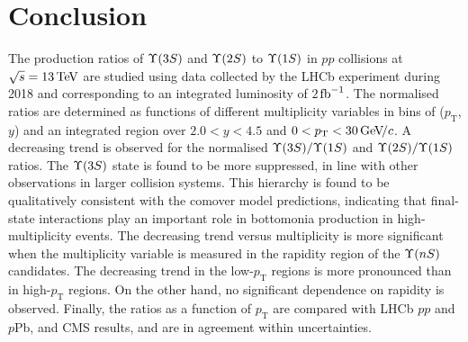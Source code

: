 \documentclass[12pt,a4paper]{article}
\newcommand{\aunit}[1]{\ensuremath{\text{\,#1}}}
\newcommand{\tev}{\aunit{Te\kern -0.1em V}\xspace}
\newcommand{\gevc}{\ensuremath{\aunit{Ge\kern -0.1em V\!/}c}\xspace}
\def\fb   {\ensuremath{\aunit{fb}}\xspace}
\def\invfb   {\ensuremath{\fb^{-1}}\xspace}
\def\pt         {\ensuremath{p_{\mathrm{T}}}\xspace}
\begin{document}
\section{Conclusion}
The production ratios of $\Upsilon{(3S)}$ and $\Upsilon{(2S)}$ to $\Upsilon{(1S)}$ in $pp$ collisions at $\sqrt{s}=13\tev$ are studied using data collected by the LHCb experiment during 2018 and corresponding to an integrated luminosity of $2$\invfb.
 The normalised ratios are determined as functions of different multiplicity variables in bins of (\pt, $y$) and an integrated region over $2.0<y<4.5$ and $0<\pt<30 \gevc$. 
 A decreasing trend is observed for the normalised $\Upsilon{(3S)}/\Upsilon{(1S)}$ and $\Upsilon{(2S)}/\Upsilon{(1S)}$ ratios. 
 The $\Upsilon{(3S)}$ state is found to be more suppressed, in line with other observations in larger collision systems. This hierarchy is found to be qualitatively consistent with the comover
model predictions, indicating that final-state interactions play an important role in bottomonia production in high-multiplicity events. 
The decreasing trend versus multiplicity is more significant when the multiplicity variable is measured in the rapidity region of the $\Upsilon{(nS)}$ candidates. 
The decreasing trend in the low-\pt regions is more pronounced than in high-\pt regions. On the other hand, no significant dependence on rapidity is observed. Finally, the ratios as a function of \pt are compared with LHCb $pp$ and $p$Pb, and CMS results, and are in agreement within uncertainties.


 
\end{document}
